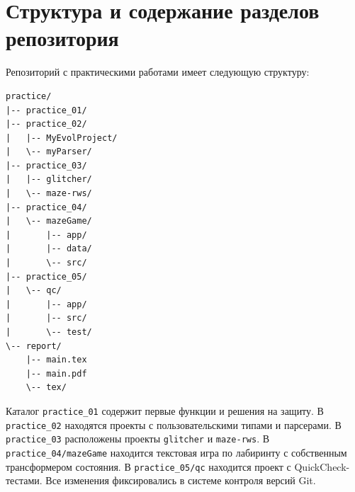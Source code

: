 \newpage

\section{Структура и содержание разделов репозитория}

Репозиторий с практическими работами имеет следующую структуру:

\begin{verbatim}
practice/
|-- practice_01/
|-- practice_02/
|   |-- MyEvolProject/
|   \-- myParser/
|-- practice_03/
|   |-- glitcher/
|   \-- maze-rws/
|-- practice_04/
|   \-- mazeGame/
|       |-- app/
|       |-- data/
|       \-- src/
|-- practice_05/
|   \-- qc/
|       |-- app/
|       |-- src/
|       \-- test/
\-- report/
    |-- main.tex
    |-- main.pdf
    \-- tex/
\end{verbatim}

Каталог \texttt{practice_01} содержит первые функции и решения на защиту. В \texttt{practice_02} находятся проекты с пользовательскими типами и парсерами. В \texttt{practice_03} расположены проекты \texttt{glitcher} и \texttt{maze-rws}. В \texttt{practice_04/mazeGame} находится текстовая игра по лабиринту с собственным трансформером состояния. В \texttt{practice_05/qc} находится проект с QuickCheck-тестами. Все изменения фиксировались в системе контроля версий Git.

\newpage
